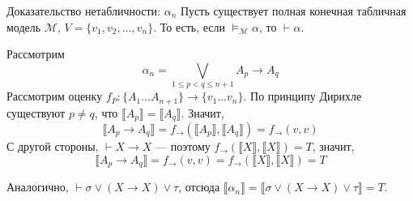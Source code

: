 \documentclass[aspectratio=169]{beamer}
\begin{document}
\begin{frame}{Доказательство нетабличности: $\alpha_n$}
Пусть существует полная конечная табличная модель $\mathcal{M}$, $V = \{v_1, v_2, \dots, v_n\}$.
То есть, если $\models_\mathcal{M}\alpha$, то $\vdash\alpha$.

Рассмотрим $$\alpha_n = 
            \bigvee_{1 \le p < q \le n+1} A_p \rightarrow A_q
           $$
Рассмотрим оценку $f_P: \{A_1 \dots A_{n+1}\} \rightarrow \{v_1 \dots v_n\}$.
По принципу Дирихле существуют $p \ne q$, что $\llbracket A_p \rrbracket = \llbracket A_q \rrbracket$.
Значит, $$\llbracket A_p \rightarrow A_q \rrbracket = f_\rightarrow (\llbracket A_p \rrbracket, \llbracket A_q \rrbracket) = f_\rightarrow(v,v)$$
С другой стороны, $\vdash X \rightarrow X$ --- поэтому $f_\rightarrow(\llbracket X \rrbracket, \llbracket X \rrbracket) = T$,
значит, $$\llbracket A_p \rightarrow A_q \rrbracket = f_\rightarrow(v,v) = f_\rightarrow(\llbracket X \rrbracket, \llbracket X \rrbracket) = T$$

Аналогично, $\vdash \sigma \vee (X \rightarrow X) \vee \tau$, отсюда $\llbracket \alpha_n \rrbracket = \llbracket \sigma \vee (X \rightarrow X) \vee \tau \rrbracket = T$.
\end{frame}
\end{document}
